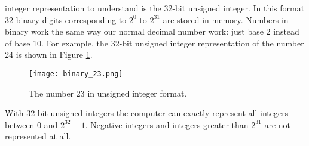 integer representation to understand is the 32-bit unsigned integer. In this format 32 binary digits corresponding to $2^0$ to $2^{31}$ are stored in memory.  Numbers in binary work the same way our normal decimal number work: just base 2 instead of base 10.  For example, the 32-bit unsigned integer representation of the number 24 is shown in Figure \ref{fig:lec1n-binary-23}.


\begin{figure}[h!]
\texttt{[image: binary\_23.png]}
\caption{The number 23 in unsigned integer format.}
\label{fig:lec1n-binary-23}
\end{figure}



With 32-bit unsigned integers the computer can exactly represent all integers between 0 and $2^{32}-1$. Negative integers and integers greater than $2^{31}$ are not represented at all.%




